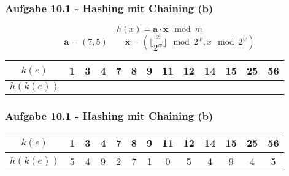   \begin{frame}[t]
    \frametitle{Aufgabe 10.1 - Hashing mit Chaining (b)}
    $$h(x) = \mathbf{a} \cdot \mathbf{x} \mod m$$
    $$\mathbf{a} = (7, 5) \qquad \mathbf{x} = \left(\lfloor \frac{x}{2^w} \rfloor \mod 2^w, x \mod 2^w\right) $$
  
    \bigskip
    \bigskip
    \bigskip
    \bigskip
    \bigskip
    \bigskip
    \bigskip
    \bigskip
  
    \begin{center}
      \begin{tabular}{c|c|c|c|c|c|c|c|c|c|c|c|c}
        $k(e)$    & 1 & 3 & 4 & 7 & 8 & 9 & 11 & 12 & 14 & 15 & 25 & 56 \\
        \hline
        $h(k(e))$ &   &   &   &   &   &   &    &    &    &    &    &    \\
      \end{tabular}
    \end{center}
  \end{frame}
  
  \begin{frame}
    \frametitle{Aufgabe 10.1 - Hashing mit Chaining (b)}
    \begin{center}
      \begin{tabular}{c|c|c|c|c|c|c|c|c|c|c|c|c}
        $k(e)$    & 1 & 3 & 4 & 7 & 8 & 9 & 11 & 12 & 14 & 15 & 25 & 56 \\
        \hline
        $h(k(e))$ & 5 & 4 & 9 & 2 & 7 & 1 & 0  & 5  & 4  & 9  & 4  & 5  \\
      \end{tabular}
    \end{center}
  \end{frame}